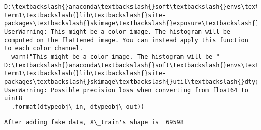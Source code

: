 \documentclass[11pt]{article}
\begin{document}
    \begin{Verbatim}[commandchars=\\\{\}]
D:\textbackslash{}anaconda\textbackslash{}soft\textbackslash{}envs\textbackslash{}carnd-term1\textbackslash{}lib\textbackslash{}site-packages\textbackslash{}skimage\textbackslash{}exposure\textbackslash{}exposure.py:63: UserWarning: This might be a color image. The histogram will be computed on the flattened image. You can instead apply this function to each color channel.
  warn("This might be a color image. The histogram will be "
D:\textbackslash{}anaconda\textbackslash{}soft\textbackslash{}envs\textbackslash{}carnd-term1\textbackslash{}lib\textbackslash{}site-packages\textbackslash{}skimage\textbackslash{}util\textbackslash{}dtype.py:130: UserWarning: Possible precision loss when converting from float64 to uint8
  .format(dtypeobj\_in, dtypeobj\_out))

    \end{Verbatim}

    \begin{Verbatim}[commandchars=\\\{\}]
After adding fake data, X\_train's shape is  69598

    \end{Verbatim}
\end{document}
